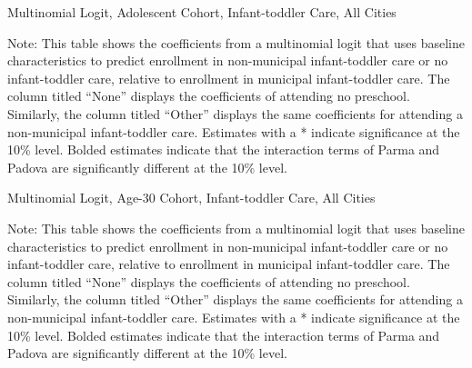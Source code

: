 \begin{table}[H]
\centering
\caption{Multinomial Logit, Adolescent Cohort,  Infant-toddler Care,  All Cities} \label{mlogit_coeff_asilo_adol}
\begin{threeparttable}

\begin{tablenotes}
\footnotesize\raggedright{Note: This table shows the coefficients from a multinomial logit that uses baseline characteristics to predict enrollment in non-municipal infant-toddler care or no infant-toddler care, relative to enrollment in municipal infant-toddler care. The column titled ``None'' displays the coefficients of attending no preschool. Similarly, the column titled ``Other'' displays the same coefficients for attending a non-municipal infant-toddler care. Estimates with a * indicate significance at the 10\% level. Bolded  estimates indicate that the interaction terms of Parma and Padova are significantly different at the 10\% level.}
\end{tablenotes}
\end{threeparttable}
\end{table}


\begin{table}[H]
\centering
\caption{Multinomial Logit, Age-30 Cohort,  Infant-toddler Care,  All Cities} \label{mlogit_coeff_asilo_age30}
\begin{threeparttable}

\begin{tablenotes}
\footnotesize\raggedright{Note: This table shows the coefficients from a multinomial logit that uses baseline characteristics to predict enrollment in non-municipal infant-toddler care or no infant-toddler care, relative to enrollment in municipal infant-toddler care. The column titled ``None'' displays the coefficients of attending no preschool. Similarly, the column titled ``Other'' displays the same coefficients for attending a non-municipal infant-toddler care. Estimates with a * indicate significance at the 10\% level. Bolded  estimates indicate that the interaction terms of Parma and Padova are significantly different at the 10\% level.}
\end{tablenotes}
\end{threeparttable}
\end{table}

